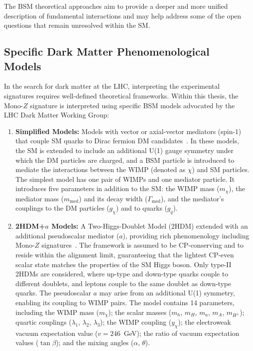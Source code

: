The BSM theoretical approaches aim to provide a deeper and more unified description of fundamental interactions and may help address some of the open questions that remain unresolved within the SM.


\subsection{Specific Dark Matter Phenomenological Models}
\label{sec:theory_dm_models}

In the search for dark matter at the LHC, interpreting the experimental signatures requires well-defined theoretical frameworks. Within this thesis, the Mono-$Z$ signature is interpreted using specific BSM models advocated by the LHC Dark Matter Working Group:

\begin{enumerate}
    \item \textbf{Simplified Models:} Models with vector or axial-vector mediators (spin-1) that couple SM quarks to Dirac fermion DM candidates~\cite{Abercrombie:2015wmb}. In these models, the SM is extended to include an additional U(1) gauge symmetry under which the DM particles are charged, and a BSM particle is introduced to mediate the interactions between the WIMP (denoted as $\chi$) and SM particles. The simplest model has one pair of WIMPs and one mediator particle. It introduces five parameters in addition to the SM: the WIMP mass ($m_\chi$), the mediator mass ($m_{\text{med}}$) and its decay width ($\Gamma_{\text{med}}$), and the mediator's couplings to the DM particles ($g_\chi$) and to quarks ($g_q$). 
    
    \item \textbf{2HDM+$a$ Models:} A Two-Higgs-Doublet Model (2HDM) extended with an additional pseudoscalar mediator ($a$), providing rich phenomenology including Mono-$Z$ signatures~\cite{Bauer:2017ota}. The framework is assumed to be CP-conserving and to reside within the alignment limit, guaranteeing that the lightest CP-even scalar state matches the properties of the SM Higgs boson. Only type-II 2HDMs are considered, where up-type and down-type quarks couple to different doublets, and leptons couple to the same doublet as down-type quarks. The pseudoscalar $a$ may arise from an additional U(1) symmetry, enabling its coupling to WIMP pairs. The model contains 14 parameters, including the WIMP mass ($m_\chi$); the scalar masses ($m_h$, $m_H$, $m_a$, $m_A$, $m_{H^\pm}$); quartic couplings ($\lambda_1$, $\lambda_2$, $\lambda_3$); the WIMP coupling ($y_\chi$); the electroweak vacuum expectation value ($v=246$~GeV); the ratio of vacuum expectation values ($\tan\beta$); and the mixing angles ($\alpha$, $\theta$).
\end{enumerate}


